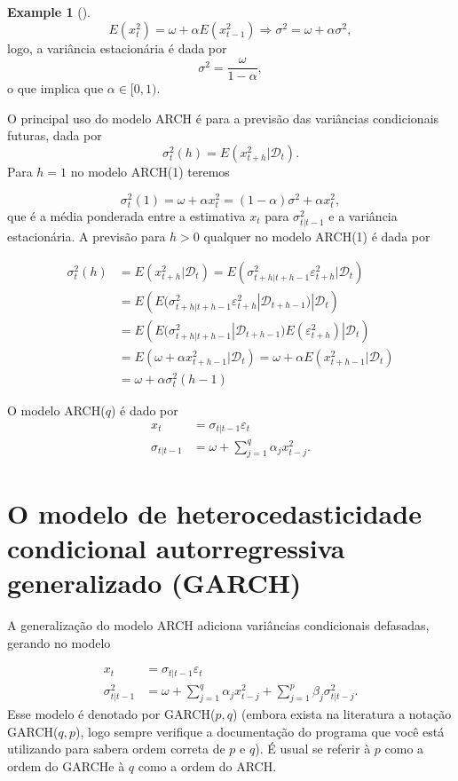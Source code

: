 \documentclass[
  letterpaper,
  DIV=11,
  numbers=noendperiod]{scrartcl}
\theoremstyle{definition}
\newtheorem{example}{Example}[chapter]
\theoremstyle{definition}
\theoremstyle{plain}
\theoremstyle{plain}
\theoremstyle{remark}
\begin{document}
\begin{example}[]
\[E(x_t^2)=\omega + \alpha E(x_{t-1}^2)\Rightarrow \sigma^2=\omega + \alpha\sigma^2,\]
logo, a variância estacionária é dada por
\[\sigma^2=\frac{\omega}{1-\alpha},\] o que implica que
\(\alpha\in[0,1)\).

O principal uso do modelo ARCH é para a previsão das variâncias
condicionais futuras, dada por
\[\sigma_t^2(h)=E(x_{t+h}^2|\mathcal{D}_t).\] Para \(h=1\) no modelo
ARCH(1) teremos

\[\sigma_t^2(1)=\omega+\alpha x_t^2=(1-\alpha)\sigma^2+\alpha x_t^2,\]
que é a média ponderada entre a estimativa \(x_t\) para
\(\sigma^2_{t|t-1}\) e a variância estacionária. A previsão para \(h>0\)
qualquer no modelo ARCH(1) é dada por

\begin{align}\sigma^2_t(h)&=E(x_{t+h}^2|\mathcal{D}_t)=E(\sigma^2_{t+h|t+h-1}\varepsilon_{t+h}^2|\mathcal{D}_t)\\ &=E\left(E(\sigma^2_{t+h|t+h-1}\varepsilon_{t+h}^2|\mathcal{D}_{t+h-1})|\mathcal{D}_t\right)\\
&=E\left(E(\sigma^2_{t+h|t+h-1}|\mathcal{D}_{t+h-1})E(\varepsilon_{t+h}^2)|\mathcal{D}_t\right)\\&=
E\left(\omega+\alpha x_{t+h-1}^2|\mathcal{D}_t\right)=\omega+\alpha E\left( x_{t+h-1}^2|\mathcal{D}_t\right)\\
&=
\omega +\alpha\sigma^2_t(h-1)\end{align}

O modelo ARCH(\(q\)) é dado por
\begin{align}x_t&=\sigma_{t|t-1}\varepsilon_t\\\sigma_{t|t-1}&=\omega + \sum_{j=1}^q \alpha_j x_{t-j}^2.\end{align}

\section{O modelo de heterocedasticidade condicional autorregressiva
generalizado
(GARCH)}\label{o-modelo-de-heterocedasticidade-condicional-autorregressiva-generalizado-garch}

A generalização do modelo ARCH adiciona variâncias condicionais
defasadas, gerando no modelo

\begin{align}x_t&=\sigma_{t|t-1}\varepsilon_t\\\sigma_{t|t-1}^2&=\omega + \sum_{j=1}^q \alpha_j x_{t-j}^2+ \sum_{j=1}^p \beta_j\sigma^2_{t|t-j}.\end{align}
Esse modelo é denotado por GARCH(\(p,q\)) (embora exista na literatura a
notação GARCH(\(q,p\)), logo sempre verifique a documentação do programa
que você está utilizando para sabera ordem correta de \(p\) e \(q\)). É
usual se referir à \(p\) como a ordem do GARCHe à \(q\) como a ordem do
ARCH.


\end{example}
\end{document}
